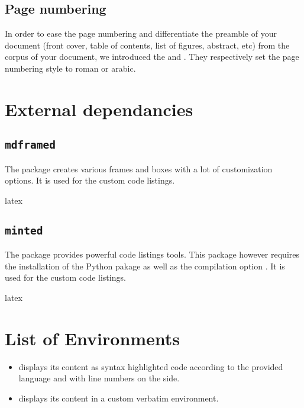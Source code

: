 \documentclass{report}
\begin{document}
\subsection{Page numbering}
In order to ease the page numbering and differentiate the preamble of your document (front cover, table of contents, list of figures, abstract, etc) from the corpus of your document, we introduced the  and . 
They respectively set the page numbering style to roman or arabic.


\section{External dependancies}


\subsection{\texttt{mdframed}}
The  package creates various frames and boxes with a lot of customization options. 
It is used for the custom code listings.

\begin{imtaCode}{latex}
    \RequirePackage{mdframed}
\end{imtaCode}


\subsection{\texttt{minted}}
The  package provides powerful code listings tools. This package however requires the installation of the Python pakage  as well as the compilation option . 
It is used for the custom code listings.

\begin{imtaCode}{latex}
    \RequirePackage{minted}
\end{imtaCode}



\section{List of Environments}
\begin{itemize}
    \item {} displays its content as syntax highlighted code according to the provided language and with line numbers on the side. 
    \item {} displays its content in a custom verbatim environment.
\end{itemize}
\end{document}
